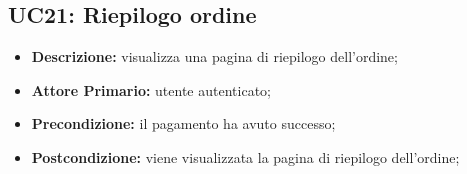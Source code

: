 \subsection{UC21: Riepilogo ordine}
\label{sec:21}
\begin{itemize}
    \item \textbf{Descrizione:} visualizza una pagina di riepilogo dell'ordine;
    \item \textbf{Attore Primario:} utente autenticato;
    \item \textbf{Precondizione:} il pagamento ha avuto successo;
    \item \textbf{Postcondizione:} viene visualizzata la pagina di riepilogo dell'ordine;
\end{itemize}
